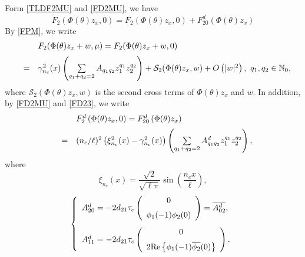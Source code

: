 \documentclass[11pt]{article}
\theoremstyle{definition}
\theoremstyle{remark}
\numberwithin{equation}{section}
\begin{document}
Form  \eqref{TLDF2MU} and   \eqref{FD2MU}, we have
\begin{equation}
\label{TLDF2}
\widetilde{F}_2( \Phi(\theta) z_x,0)=F_2( \Phi(\theta) z_x,0)+F^d_{20}\left (\Phi(\theta) z_x\right)
\end{equation}
By \eqref{FPM},  we  write
\begin{equation}
\label{F2EXP}
\begin{array}{lll}
&&F_2(\Phi(\theta) z_x+w,\mu) =F_2(\Phi(\theta)
z_x+w,0)   \vspace{0.2cm}\\
&=&\gamma_{n_c}^2(x)\left(\sum\limits_{q_1+q_2=2}A_{q_1q_2}z_1^{q_1}z_2^{q_2}\right)
+\mathcal{S}_2(\Phi(\theta)
z_x,w)+O\left(|w|^2\right), ~q_1,q_2 \in \mathbb{N}_0,
\end{array}
\end{equation}
where   $\mathcal{S}_2(\Phi(\theta)
z_x,w)$  is the second cross terms of $\Phi (\theta) z_x$ and $w$.
In addition,  by  \eqref{FD2MU} and \eqref{FD23},   we write
\begin{equation}
\label{F2DEXP}
\begin{array}{lll}
&& F^d_2\left (\Phi(\theta) z_x, 0\right)=F^d_{20}\left (\Phi(\theta) z_x\right) \vspace{0.2cm}\\
&=&(n_c/\ell)^2\left(\xi^2_{n_c}(x)- \gamma_{n_c}^2(x)\right) \left(\sum\limits_{q_1+q_2=2}A^d_{q_1q_2} z_1^{q_1}z_2^{q_2}\right),
\end{array}
\end{equation}
where
$$\xi_{n_c}(x)=\frac{\sqrt{2}}{\sqrt{\ell \pi}}\sin\left(\frac{n_cx}{\ell}\right),$$
\begin{equation}
\label{AIJD}
\left\{
\begin{array}{l}
 A_{20}^d=-
2d_{21}\tau_c\left(\begin{array}{c}
0\vspace{0.2cm}\\
\phi_1(-1) \phi_2(0)
\end{array}\right) =\overline{A_{02}^d},
 \vspace{0.3cm}\\
 A_{11}^d=-
2d_{21}\tau_c\left(\begin{array}{c}
0\vspace{0.2cm}\\
2\mbox{Re}\left\{\phi _1(-1) \overline{\phi_2}(0)\right\}
\end{array}\right).
\end{array}
\right.
\end{equation}
\end{document}
